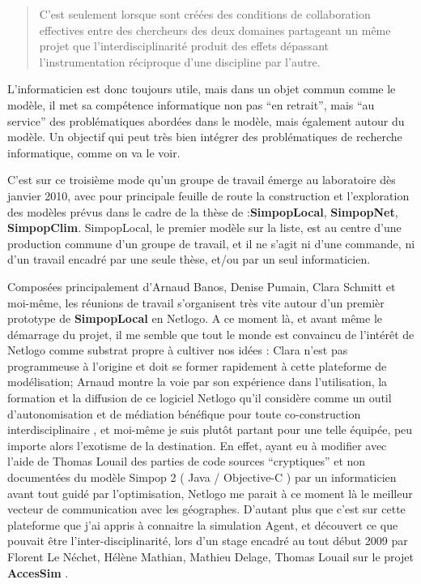 \blockquote[\cite{Pumain2014}]{C’est seulement lorsque sont créées des conditions de collaboration effectives entre des chercheurs des deux domaines partageant un même projet que l’interdisciplinarité produit des effets dépassant l’instrumentation réciproque d’une discipline par l’autre.}

L'informaticien est donc toujours utile, mais dans un objet commun comme le modèle, il met sa compétence informatique non pas \enquote{en retrait}, mais \enquote{au service} des problématiques abordées dans le modèle, mais également autour du modèle. Un objectif qui peut très bien intégrer des problématiques de recherche informatique, comme on va le voir.



C'est sur ce troisième mode qu'un groupe de travail émerge au laboratoire dès janvier 2010, avec pour principale feuille de route la construction et l'exploration des modèles prévus dans le cadre de la thèse de \textcite{Schmitt2014} :\textbf{SimpopLocal}, \textbf{SimpopNet}, \textbf{SimpopClim}. SimpopLocal, le premier modèle sur la liste, est au centre d'une production commune d'un groupe de travail, et il ne s'agit ni d'une commande, ni d'un travail encadré par une seule thèse, et/ou par un seul informaticien.

Composées principalement d'Arnaud Banos, Denise Pumain, Clara Schmitt et moi-même, les réunions de travail s'organisent très vite autour d'un premièr prototype de \textbf{SimpopLocal} en Netlogo. A ce moment là, et avant même le démarrage du projet, il me semble que tout le monde est convaincu de l'intérêt de Netlogo comme substrat propre à cultiver nos idées : Clara n'est pas programmeuse à l'origine et doit se former rapidement à cette plateforme de modélisation; Arnaud montre la voie par son expérience dans l'utilisation, la formation et la diffusion de ce logiciel Netlogo qu'il considère comme un outil d'autonomisation et de médiation bénéfique pour toute co-construction interdisciplinaire \autocite{Banos2013}, et moi-même je suis plutôt partant pour une telle équipée, peu importe alors l'exotisme de la destination. En effet, ayant eu à modifier avec l'aide de Thomas Louail des parties de code sources \enquote{cryptiques} et non documentées du modèle Simpop 2 ( Java / Objective-C )  par un informaticien avant tout guidé par l'optimisation, Netlogo me parait à ce moment là le meilleur vecteur de communication avec les géographes. D'autant plus que c'est sur cette plateforme que j'ai appris à connaitre la simulation Agent, et découvert ce que pouvait être l'inter-disciplinarité, lors d'un stage encadré au tout début 2009 par Florent Le Néchet, Hélène Mathian, Mathieu Delage, Thomas Louail sur le projet \textbf{AccesSim} \autocite{Delage2010}.

